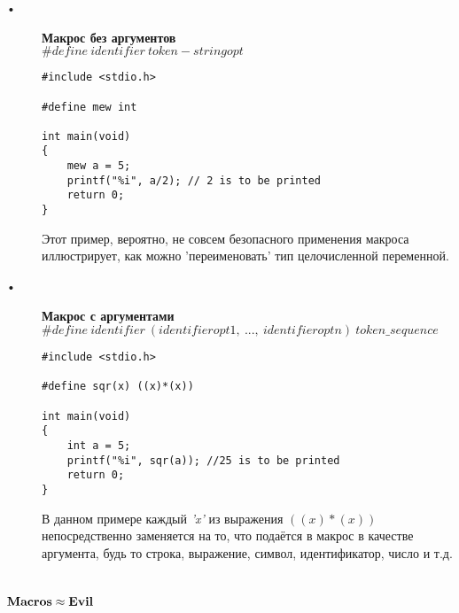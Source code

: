\documentclass[a4paper]{article}
\begin{document}
	\begin{description}
	\item[•]\textbf{Макрос без аргументов} \\
			$\#define\ identifier\ token-stringopt$ \\
				\begin{lstlisting}[caption={Пример применения макроса без аргументов}]
#include <stdio.h>

#define mew int

int main(void)
{
    mew a = 5;
    printf("%i", a/2); // 2 is to be printed
    return 0;
}
				\end{lstlisting}
			Этот пример, вероятно, не совсем безопасного применения макроса иллюстрирует, как можно 'переименовать' тип целочисленной переменной.
			
\newpage			
			
	\item[•]\textbf{Макрос с аргументами} \\
		$\#define\ identifier\ (identifieropt1,\ ...,\ identifieroptn)\ token\_sequence$
				\begin{lstlisting}[caption={Пример применения макроса с аргументами}]
#include <stdio.h>

#define sqr(x) ((x)*(x)) 

int main(void)
{
    int a = 5;
    printf("%i", sqr(a)); //25 is to be printed
    return 0;
}
				\end{lstlisting}
				В данном примере каждый \textit{'x'} из выражения $((x)*(x))$ непосредственно заменяется на то, что подаётся в макрос в качестве аргумента, будь то строка, выражение, символ, идентификатор, число и т.д. 
	\end{description}
	
	\section{$\bf{Macros \approx Evil}$}
	
\end{document}
